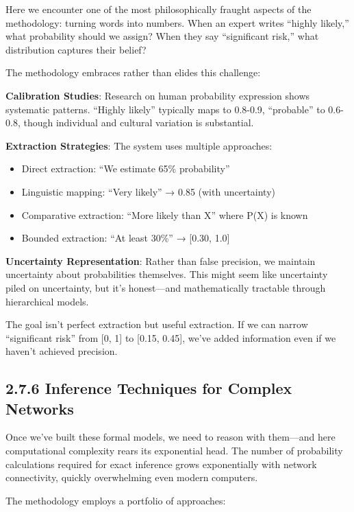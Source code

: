 \documentclass[
  11pt,
  letterpaper,
]{book}
\providecommand{\tightlist}{%
  \setlength{\itemsep}{0pt}\setlength{\parskip}{0pt}}
\begin{document}
Here we encounter one of the most philosophically fraught aspects of the
methodology: turning words into numbers. When an expert writes ``highly
likely,'' what probability should we assign? When they say ``significant
risk,'' what distribution captures their belief?

The methodology embraces rather than elides this challenge:

\textbf{Calibration Studies}: Research on human probability expression
shows systematic patterns. ``Highly likely'' typically maps to 0.8-0.9,
``probable'' to 0.6-0.8, though individual and cultural variation is
substantial.

\textbf{Extraction Strategies}: The system uses multiple approaches:

\begin{itemize}
\tightlist
\item
  Direct extraction: ``We estimate 65\% probability''
\item
  Linguistic mapping: ``Very likely'' → 0.85 (with uncertainty)
\item
  Comparative extraction: ``More likely than X'' where P(X) is known
\item
  Bounded extraction: ``At least 30\%'' → {[}0.30, 1.0{]}
\end{itemize}

\textbf{Uncertainty Representation}: Rather than false precision, we
maintain uncertainty about probabilities themselves. This might seem
like uncertainty piled on uncertainty, but it's honest---and
mathematically tractable through hierarchical models.

The goal isn't perfect extraction but useful extraction. If we can
narrow ``significant risk'' from {[}0, 1{]} to {[}0.15, 0.45{]}, we've
added information even if we haven't achieved precision.

\subsection{2.7.6 Inference Techniques for Complex
Networks}\label{sec-inference-techniques}

Once we've built these formal models, we need to reason with them---and
here computational complexity rears its exponential head. The number of
probability calculations required for exact inference grows
exponentially with network connectivity, quickly overwhelming even
modern computers.

The methodology employs a portfolio of approaches:
\end{document}
